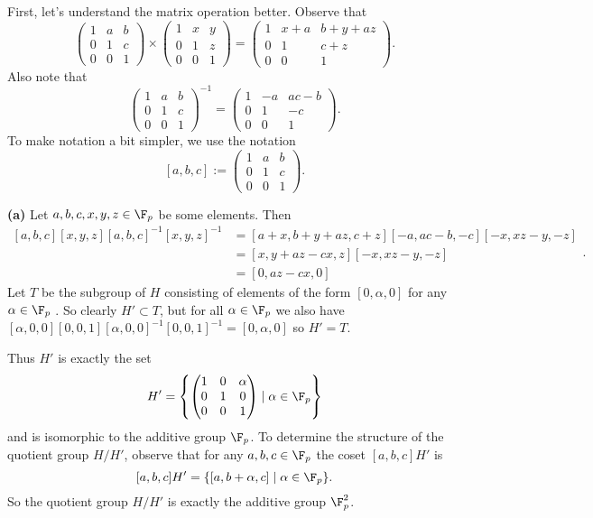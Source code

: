 \documentclass[11pt,letterpaper]{article}
\begin{document}
First, let's understand the matrix operation better. Observe that 
\[
  \begin{pmatrix}
    1 & a & b \\
    0 & 1 & c \\
    0 & 0 & 1
    \end{pmatrix} \times \begin{pmatrix}
      1 & x & y \\
      0 & 1 & z \\
      0 & 0 & 1
      \end{pmatrix}=\begin{pmatrix}
        1 & x+a & b+y+az \\
        0 & 1 & c+z \\
        0 & 0 & 1
        \end{pmatrix}
.\]
Also note that
\[
  \begin{pmatrix}
    1 & a & b \\
    0 & 1 & c \\
    0 & 0 & 1
    \end{pmatrix}^{-1}=\begin{pmatrix}
      1 & -a & ac-b \\
      0 & 1 & -c \\
      0 & 0 & 1
      \end{pmatrix}
.\]   
To make notation a bit simpler, we use the notation
\[
  [a,b,c] := \begin{pmatrix}
    1 & a & b \\
    0 & 1 & c \\
    0 & 0 & 1
    \end{pmatrix}
.\]

\textbf{(a)} Let $a,b,c,x,y,z\in \F_p$  be some elements. Then
\[
  \begin{aligned}
    [a,b,c] [x,y,z] [a,b,c]^{-1} [x,y,z]^{-1}&=[a+x, b+y+az, c+z] [-a, ac-b, -c] [-x, xz-y, -z]\\
    &=[x,y+az-cx,z][-x,xz-y, -z]\\
    &=[0,az-cx, 0]
  \end{aligned}
.\]
Let $T$ be the subgroup of $H$ consisting of elements of the form $[0,\alpha,0]$ for any $\alpha\in \F_p$ . So clearly $H'\subset T$, but for all $\alpha\in \F_p$ we also have $[\alpha, 0, 0][0,0,1][\alpha,0,0]^{-1}[0,0,1]^{-1}=[0,\alpha, 0]$ so $H'=T$.

Thus $H'$ is exactly the set
\[
  H'=\left\{\begin{pmatrix}
    1 & 0 & \alpha \\
    0 & 1 & 0 \\
    0 & 0 & 1
    \end{pmatrix}\mid \alpha\in \F_p\right\}
\]
and is isomorphic to the additive group $\F_p$. To determine the structure of the quotient group $H/H'$, observe that for any $a,b,c\in \F_p$ the coset $[a,b,c]H'$ is
\[
  [a,b,c]H' = \{[a,b+\alpha,c] \mid \alpha\in \F_p\}
.\]
So the quotient group $H/H'$ is exactly the additive group $\F_p^2$.   
\end{document}
